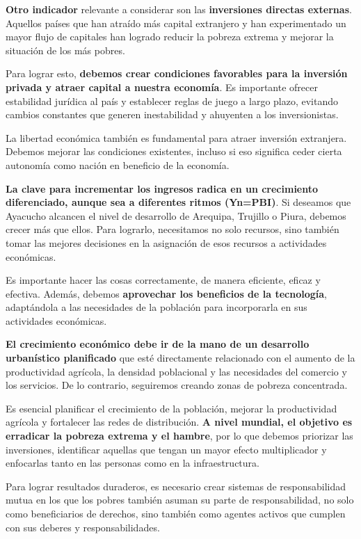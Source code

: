 \documentclass[
  a4paper,
]{article}
\begin{document}
\textbf{Otro indicador} relevante a considerar son las
\textbf{inversiones directas externas}. Aquellos países que han atraído
más capital extranjero y han experimentado un mayor flujo de capitales
han logrado reducir la pobreza extrema y mejorar la situación de los más
pobres.

Para lograr esto, \textbf{debemos crear condiciones favorables para la
inversión privada y atraer capital a nuestra economía}. Es importante
ofrecer estabilidad jurídica al país y establecer reglas de juego a
largo plazo, evitando cambios constantes que generen inestabilidad y
ahuyenten a los inversionistas.

La libertad económica también es fundamental para atraer inversión
extranjera. Debemos mejorar las condiciones existentes, incluso si eso
significa ceder cierta autonomía como nación en beneficio de la
economía.

\textbf{La clave para incrementar los ingresos radica en un crecimiento
diferenciado, aunque sea a diferentes ritmos (Yn=PBI)}. Si deseamos que
Ayacucho alcancen el nivel de desarrollo de Arequipa, Trujillo o Piura,
debemos crecer más que ellos. Para lograrlo, necesitamos no solo
recursos, sino también tomar las mejores decisiones en la asignación de
esos recursos a actividades económicas.

Es importante hacer las cosas correctamente, de manera eficiente, eficaz
y efectiva. Además, debemos \textbf{aprovechar los beneficios de la
tecnología}, adaptándola a las necesidades de la población para
incorporarla en sus actividades económicas.

\textbf{El crecimiento económico debe ir de la mano de un desarrollo
urbanístico planificado} que esté directamente relacionado con el
aumento de la productividad agrícola, la densidad poblacional y las
necesidades del comercio y los servicios. De lo contrario, seguiremos
creando zonas de pobreza concentrada.

Es esencial planificar el crecimiento de la población, mejorar la
productividad agrícola y fortalecer las redes de distribución. \textbf{A
nivel mundial, el objetivo es erradicar la pobreza extrema y el hambre},
por lo que debemos priorizar las inversiones, identificar aquellas que
tengan un mayor efecto multiplicador y enfocarlas tanto en las personas
como en la infraestructura.

Para lograr resultados duraderos, es necesario crear sistemas de
responsabilidad mutua en los que los pobres también asuman su parte de
responsabilidad, no solo como beneficiarios de derechos, sino también
como agentes activos que cumplen con sus deberes y responsabilidades.
\end{document}
